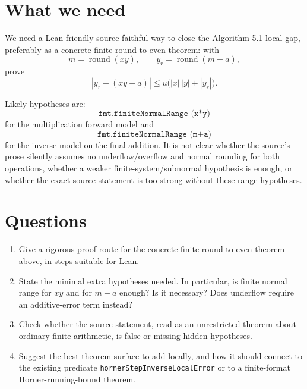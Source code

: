 \documentclass{article}
\begin{document}
\section*{What we need}

We need a Lean-friendly source-faithful way to close the Algorithm 5.1
local gap, preferably as a concrete finite round-to-even theorem:
with
\[
m=\operatorname{round}(xy),\qquad
y_r=\operatorname{round}(m+a),
\]
prove
\[
 |y_r-(xy+a)| \le u\bigl(|x|\,|y|+|y_r|\bigr).
\]

Likely hypotheses are:
\[
\texttt{fmt.finiteNormalRange (x*y)}
\]
for the multiplication forward model and
\[
\texttt{fmt.finiteNormalRange (m+a)}
\]
for the inverse model on the final addition. It is not clear whether the
source's prose silently assumes no underflow/overflow and normal rounding
for both operations, whether a weaker finite-system/subnormal hypothesis is
enough, or whether the exact source statement is too strong without these
range hypotheses.

\section*{Questions}

\begin{enumerate}
\item Give a rigorous proof route for the concrete finite round-to-even
  theorem above, in steps suitable for Lean.
\item State the minimal extra hypotheses needed. In particular, is finite
  normal range for $xy$ and for $m+a$ enough? Is it necessary? Does
  underflow require an additive-error term instead?
\item Check whether the source statement, read as an unrestricted theorem
  about ordinary finite arithmetic, is false or missing hidden hypotheses.
\item Suggest the best theorem surface to add locally, and how it should
  connect to the existing predicate \texttt{hornerStepInverseLocalError}
  or to a finite-format Horner-running-bound theorem.
\end{enumerate}
\end{document}
